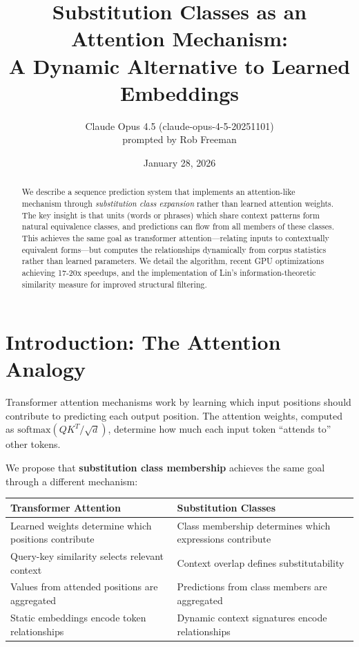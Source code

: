 \documentclass[11pt,a4paper]{article}
\title{Substitution Classes as an Attention Mechanism:\\
A Dynamic Alternative to Learned Embeddings}
\author{Claude Opus 4.5 (claude-opus-4-5-20251101)\\
prompted by Rob Freeman}
\date{January 28, 2026}
\begin{document}
\maketitle

\begin{abstract}
We describe a sequence prediction system that implements an attention-like mechanism through \emph{substitution class expansion} rather than learned attention weights. The key insight is that units (words or phrases) which share context patterns form natural equivalence classes, and predictions can flow from all members of these classes. This achieves the same goal as transformer attention---relating inputs to contextually equivalent forms---but computes the relationships dynamically from corpus statistics rather than learned parameters. We detail the algorithm, recent GPU optimizations achieving 17-20x speedups, and the implementation of Lin's information-theoretic similarity measure for improved structural filtering.
\end{abstract}

\section{Introduction: The Attention Analogy}

Transformer attention mechanisms work by learning which input positions should contribute to predicting each output position. The attention weights, computed as $\text{softmax}(QK^T/\sqrt{d})$, determine how much each input token ``attends to'' other tokens.

We propose that \textbf{substitution class membership} achieves the same goal through a different mechanism:

\begin{center}
\begin{tabular}{|p{}|p{}|}
\hline
\textbf{Transformer Attention} & \textbf{Substitution Classes} \\
\hline
Learned weights determine which positions contribute & Class membership determines which expressions contribute \\
\hline
Query-key similarity selects relevant context & Context overlap defines substitutability \\
\hline
Values from attended positions are aggregated & Predictions from class members are aggregated \\
\hline
Static embeddings encode token relationships & Dynamic context signatures encode relationships \\
\hline
\end{tabular}
\end{center}
\end{document}
